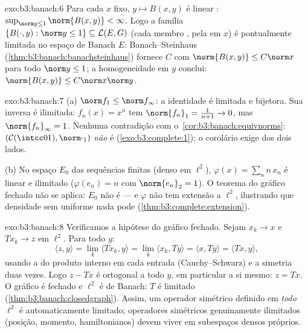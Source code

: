 \begin{solution}{exo:b3:banach:6}
Para cada $x$ fixo, $y \mapsto B(x, y)$ é linear :
$\sup_{\norm y \leq 1}\norm{B(x,y)} < \infty$. Logo a família
$\{B(\cdot, y) : \norm y \leq 1\} \subseteq \mathcal L(E, G)$
(cada membro , pela  em $x$) é pontualmente
limitada no espaço de Banach $E$: Banach--Steinhaus
(\cref{thm:b3:banach:banachsteinhaus}) fornece $C$ com
$\norm{B(x,y)} \leq C\norm x$ para todo $\norm y \leq 1$;
a homogeneidade em $y$ conclui: $\norm{B(x,y)} \leq
C\norm x\norm y$.
\end{solution}

\begin{solution}{exo:b3:banach:7}
(a) $\norm f_1 \leq \norm f_\infty$: a identidade é limitada
e bijetora. Sua inversa é ilimitada: $f_n(x) = x^n$ tem
$\norm{f_n}_1 = \frac1{n+1} \to 0$, mas $\norm{f_n}_\infty = 1$.
Nenhuma contradição com o~\cref{cor:b3:banach:equivnorms}: $(\mathcal
C(\intcc01), \norm\cdot_1)$ \emph{não} é 
(\cref{exo:b3:complete:1}); o corolário exige 
dos dois lados.

(b) No espaço $E_0$ das sequências finitas (denso em $\ell^2$),
$\varphi(x) = \sum_n n\,x_n$ é linear e ilimitado
($\varphi(e_n) = n$ com $\norm{e_n}_2 = 1$). O teorema do gráfico
fechado não se aplica: $E_0$ não é  --- e $\varphi$
não tem extensão  a $\ell^2$, ilustrando que
densidade sem  uniforme nada pode
(\cref{thm:b3:complete:extension}).
\end{solution}

\begin{solution}{exo:b3:banach:8}
Verificamos a hipótese do gráfico fechado. Sejam $x_k \to x$ e
$Tx_k \to z$ em $\ell^2$. Para todo $y$:
\[
\langle z, y\rangle = \lim_k\langle Tx_k, y\rangle
= \lim_k \langle x_k, Ty\rangle = \langle x, Ty\rangle
= \langle Tx, y\rangle,
\]
usando a  do produto interno em cada entrada
(Cauchy--Schwarz) e a simetria duas vezes. Logo $z - Tx$ é ortogonal
a todo $y$, em particular a si mesmo: $z = Tx$. O gráfico é
fechado e $\ell^2$ é de Banach: $T$ é limitado
(\cref{thm:b3:banach:closedgraph}). Assim, um operador simétrico
definido em \emph{todo} $\ell^2$ é automaticamente limitado;
operadores simétricos genuinamente ilimitados (posição, momento,
hamiltonianos) devem viver em subespaços densos próprios.
\end{solution}

